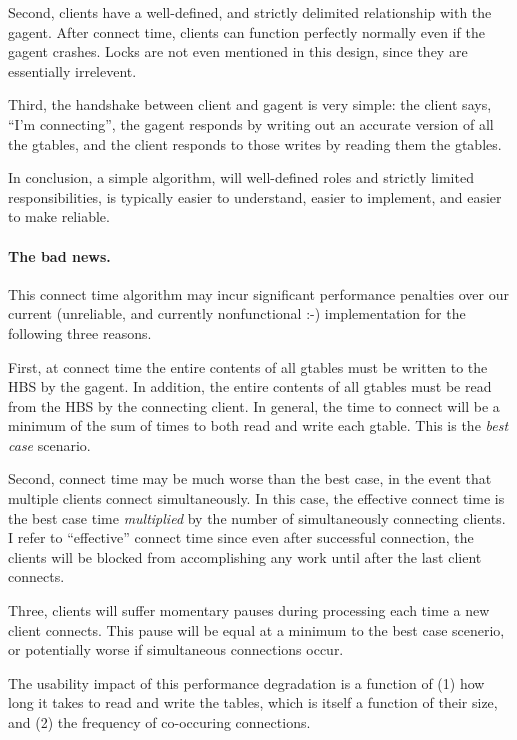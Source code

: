 Second, clients have a well-defined, and strictly delimited relationship
with the gagent. After connect time, clients can function perfectly
normally even if the gagent crashes. Locks are not even mentioned in this
design, since they are essentially irrelevent.

Third, the handshake between client and gagent is very simple: the client
says, ``I'm connecting'', the gagent responds by writing out an accurate
version of all the gtables, and the client responds to those writes by
reading them the gtables. 

In conclusion, a simple algorithm, will well-defined roles and strictly
limited responsibilities, is typically easier to understand, easier to
implement, and easier to make reliable.

\paragraph {The bad news.}  
This connect time algorithm may incur significant performance penalties 
over our current (unreliable, and currently nonfunctional :-)
implementation for the following three reasons.

First, at connect time the entire contents of all gtables must be written
to the HBS by the gagent.  In addition, the entire contents of all gtables
must be read from the HBS by the connecting client. In general, the time to
connect will be a minimum of the sum of times to both read and write each
gtable. This is the {\em best case} scenario.

Second, connect time may be much worse than the best case, in the event
that multiple clients connect simultaneously.  In this case, the effective
connect time is the best case time {\em multiplied} by the number of
simultaneously connecting clients.  I refer to ``effective'' connect time
since even after successful connection, the clients will be blocked from
accomplishing any work until after the last client connects. 

Three, clients will suffer momentary pauses during processing each time a
new client connects. This pause will be equal at a minimum to the best case
scenerio, or potentially worse if simultaneous connections occur.  

The usability impact of this performance degradation is a function of (1)
how long it takes to read and write the tables, which is itself a function
of their size, and (2) the frequency of co-occuring connections.

